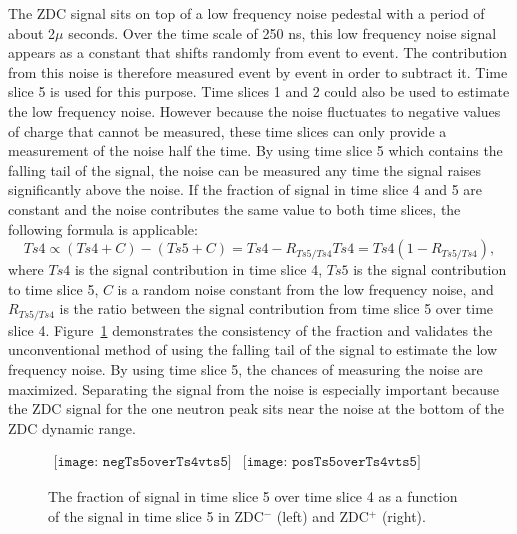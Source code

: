      The ZDC signal sits on top of a low frequency noise pedestal with a 
        period of about 2$\mu$ seconds. 
      Over the time scale of 250 ns, this low frequency noise signal appears
        as a constant that shifts randomly from event to event.
      The contribution from this noise is therefore measured event by event
        in order to subtract it.
      Time slice 5 is used for this purpose.
      Time slices 1 and 2 could also be used to estimate the low frequency 
        noise.
      However because the noise fluctuates to negative values of charge that 
        cannot be measured, these time slices can only provide a 
        measurement of the noise half the time. 
      By using time slice 5 which contains the falling tail of the signal, 
        the noise can be measured any time the signal raises significantly 
        above the noise.
      If the fraction of signal in time slice 4 and 5 are constant and
        the noise contributes the same value to both time slices, the 
        following formula is applicable:
      \begin{equation}
        Ts4 \propto (Ts4 + C) - ( Ts5 + C ) = Ts4 - R_{Ts5/Ts4}Ts4 
        = Ts4(1-R_{Ts5/Ts4}),
        \label{eq:ts4ish}
      \end{equation}
      where $Ts4$ is the signal contribution in time slice 4, $Ts5$ is the 
        signal contribution to time slice 5, $C$ is a random noise constant
        from the low frequency noise, and $R_{Ts5/Ts4}$ is the ratio between
        the signal contribution from time slice 5 over time slice 4.
      Figure~\ref{fig:zdcTs4OvTs5VTs5} demonstrates the consistency of the 
        fraction and validates the unconventional method of using the falling 
        tail of the signal to estimate the low frequency noise. 
      By using time slice 5, the chances of measuring the noise are maximized. 
      Separating the signal from the noise is especially important because
        the ZDC signal for the one neutron peak sits near the noise at the 
        bottom of the ZDC dynamic range.
      \begin{figure}[!Hhbt]
        \centering
        $ \begin{array}{cc}
          \texttt{[image: negTs5overTs4vts5]} &
          \texttt{[image: posTs5overTs4vts5]}
        \end{array} $  
        \caption{ The fraction of signal in time slice 5 over time slice 4 
          as a function of the signal in time slice 5 in ZDC$^{-}$ (left) and 
          ZDC$^{+}$ (right).}
        \label{fig:zdcTs4OvTs5VTs5}
      \end{figure}

